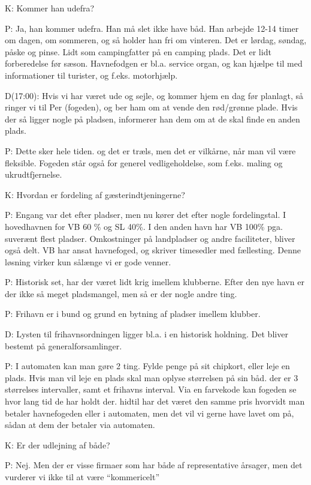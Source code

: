 K: Kommer han udefra?

P: Ja, han kommer udefra. Han må slet ikke have båd. Han arbejde 12-14 timer om dagen, om sommeren, og så holder han fri om vinteren. Det er lørdag, søndag, påske og pinse. Lidt som campingfatter på en camping plads. Det er lidt forberedelse før sæson. Havnefodgen er bl.a. service organ, og kan hjælpe til med informationer til turister, og f.eks. motorhjælp.

D(17:00): Hvis vi har været ude og sejle, og kommer hjem en dag før planlagt, så ringer vi til Per (fogeden), og ber ham om at vende den rød/grønne plade. Hvis der så ligger nogle på pladsen, informerer han dem om at de skal finde en anden plads.

P: Dette sker hele tiden. og det er træls, men det er vilkårne, når man vil være fleksible. Fogeden står også for generel vedligeholdelse, som f.eks. maling og ukrudtfjernelse.


K: Hvordan er fordeling af gæsterindtjeningerne?

P: Engang var det efter pladser, men nu kører det efter nogle fordelingstal. I hovedhavnen for VB 60 \% og SL 40\%. I den anden havn har VB 100\% pga. suverænt flest pladser. Omkostninger på landpladser og andre faciliteter, bliver også delt. VB har ansat havnefoged, og skriver timesedler med fællesting. Denne løsning virker kun sålænge vi er gode venner.


P: Historisk set, har der været lidt krig imellem klubberne. Efter den nye havn er der ikke så meget pladsmangel, men så er der nogle andre ting.


P: Frihavn er i bund og grund en bytning af pladser imellem klubber.


D: Lysten til frihavnsordningen ligger bl.a. i en historisk holdning. Det bliver bestemt på generalforsamlinger.


P: I automaten kan man gøre 2 ting. Fylde penge på sit chipkort, eller leje en plads. Hvis man vil leje en plads skal man oplyse størrelsen på sin båd. der er 3 størrelses intervaller, samt et frihavns interval. Via en farvekode kan fogeden se hvor lang tid de har holdt der. hidtil har det været den samme pris hvorvidt man betaler havnefogeden eller i automaten, men det vil vi gerne have lavet om på, sådan at dem der betaler via automaten.


K: Er der udlejning af både?

P: Nej. Men der er visse firmaer som har både af representative årsager, men det vurderer vi ikke til at være “kommericelt”


